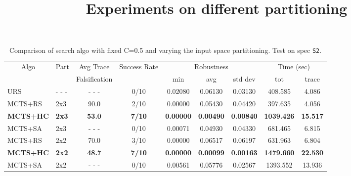 \documentclass[11pt]{article}
\begin{document}
\begin{table}[ht]
\centering
\title{Experiments on different partitioning}
\begin{tabular}{|l|l|c|c|c|c|c|c|c|}
\hline
\multicolumn{1}{|c|}{\multirow{2}{*}{Algo}} & \multirow{2}{*}{Part} & Avg Trace               & \multirow{2}{*}{Success Rate} & \multicolumn{3}{c|}{Robustness} & \multicolumn{2}{c|}{Time (sec)} \\ \cline{5-9} 
\multicolumn{1}{|c|}{}                      &                    & Falsification           &                               & min      & avg      & std dev  & tot        & trace        \\ \hline
URS                                         & - - -              & - - -                   & 0/10                          & 0.02080  & 0.06130  & 0.03130  &  408.585   &  4.086       \\ \hline
MCTS+RS                                     & 2x3                &  90.0                   & 2/10                          & 0.00000  & 0.05430  & 0.04420  &  397.635   &  4.056       \\
\textbf{MCTS+HC}                                     & \textbf{2x3}                &  \textbf{53.0}                   & \textbf{7/10}                          & \textbf{0.00000}  & \textbf{0.00490}  & \textbf{0.00840}  & \textbf{1039.426}   & \textbf{15.517}       \\
MCTS+SA                                     & 2x3                & - - -                   & 0/10                          & 0.00071  & 0.04930  & 0.04330  &  681.465   &  6.815       \\ \hline

MCTS+RS                                     & 2x2                &  70.0                   & 3/10                          & 0.00000  & 0.06517  & 0.06197  &  631.963   &  6.804       \\
\textbf{MCTS+HC}                                     & \textbf{2x2}                &  \textbf{48.7}                   & \textbf{7/10}                          & \textbf{0.00000}  & \textbf{0.00099}  & \textbf{0.00163}  & \textbf{1479.660}   & \textbf{22.530}       \\
MCTS+SA                                     & 2x2                & - - -                   & 0/10                          & 0.00561  & 0.05776  & 0.02567  & 1393.552   & 13.936       \\ \hline
\end{tabular}
\caption{Comparison of search algo with fixed C=0.5 and varying the input space partitioning. Test on spec \texttt{S2}.}~\label{table:patitioning}
\end{table}
\end{document}
